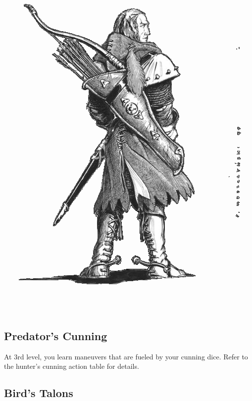 \begin{multicols*}{2}
\begin{Figure}
\centering
\includegraphics[width=\textwidth]{img/longbow.png}
\end{Figure}

\subsection*{Predator's Cunning}

At 3rd level, you learn maneuvers that are fueled by your cunning dice. Refer to the hunter's cunning action table for details.

\subsection*{Bird's Talons}


\end{multicols*}
